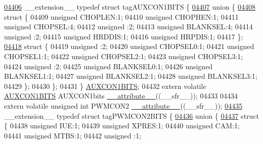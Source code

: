 \begin{DoxyCode}
\hypertarget{a00009_source_l04406}{}\hyperlink{a00008}{04406} \_\_extension\_\_ \textcolor{keyword}{typedef} \textcolor{keyword}{struct }tagAUXCON1BITS \{
\hypertarget{a00009_source_l04407}{}\hyperlink{a00009}{04407}   \textcolor{keyword}{union }\{
\hypertarget{a00009_source_l04408}{}\hyperlink{a00009}{04408}     \textcolor{keyword}{struct }\{
04409       \textcolor{keywordtype}{unsigned} CHOPLEN:1;
04410       \textcolor{keywordtype}{unsigned} CHOPHEN:1;
04411       \textcolor{keywordtype}{unsigned} CHOPSEL:4;
04412       \textcolor{keywordtype}{unsigned} :2;
04413       \textcolor{keywordtype}{unsigned} BLANKSEL:4;
04414       \textcolor{keywordtype}{unsigned} :2;
04415       \textcolor{keywordtype}{unsigned} HRDDIS:1;
04416       \textcolor{keywordtype}{unsigned} HRPDIS:1;
04417     \};
\hypertarget{a00009_source_l04418}{}\hyperlink{a00009}{04418}     \textcolor{keyword}{struct }\{
04419       \textcolor{keywordtype}{unsigned} :2;
04420       \textcolor{keywordtype}{unsigned} CHOPSEL0:1;
04421       \textcolor{keywordtype}{unsigned} CHOPSEL1:1;
04422       \textcolor{keywordtype}{unsigned} CHOPSEL2:1;
04423       \textcolor{keywordtype}{unsigned} CHOPSEL3:1;
04424       \textcolor{keywordtype}{unsigned} :2;
04425       \textcolor{keywordtype}{unsigned} BLANKSEL0:1;
04426       \textcolor{keywordtype}{unsigned} BLANKSEL1:1;
04427       \textcolor{keywordtype}{unsigned} BLANKSEL2:1;
04428       \textcolor{keywordtype}{unsigned} BLANKSEL3:1;
04429     \};
04430   \};
04431 \} \hyperlink{a00008_dd/d42/a00109}{AUXCON1BITS};
04432 \textcolor{keyword}{extern} \textcolor{keyword}{volatile} \hyperlink{a00008_dd/d42/a00109}{AUXCON1BITS} AUXCON1bits \hyperlink{a00009_a493c46f03454991ccc5aa7a6e1dfb2a7}{\_\_attribute\_\_}((\_\_sfr\_\_));
04433 
04434 \textcolor{keyword}{extern} \textcolor{keyword}{volatile} \textcolor{keywordtype}{unsigned} \textcolor{keywordtype}{int}  PWMCON2 \hyperlink{a00009_a493c46f03454991ccc5aa7a6e1dfb2a7}{\_\_attribute\_\_}((\_\_sfr\_\_));
\hypertarget{a00009_source_l04435}{}\hyperlink{a00008}{04435} \_\_extension\_\_ \textcolor{keyword}{typedef} \textcolor{keyword}{struct }tagPWMCON2BITS \{
\hypertarget{a00009_source_l04436}{}\hyperlink{a00009}{04436}   \textcolor{keyword}{union }\{
\hypertarget{a00009_source_l04437}{}\hyperlink{a00009}{04437}     \textcolor{keyword}{struct }\{
04438       \textcolor{keywordtype}{unsigned} IUE:1;
04439       \textcolor{keywordtype}{unsigned} XPRES:1;
04440       \textcolor{keywordtype}{unsigned} CAM:1;
04441       \textcolor{keywordtype}{unsigned} MTBS:1;
04442       \textcolor{keywordtype}{unsigned} :1;

\end{DoxyCode}

